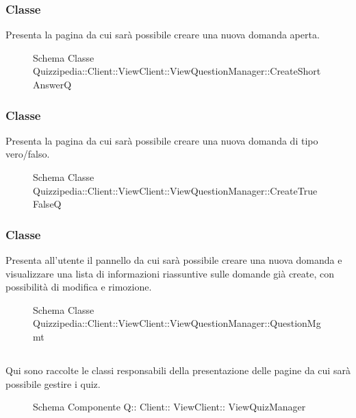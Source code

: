 \subsubsection{Classe }
Presenta la pagina da cui sarà possibile creare una nuova domanda aperta.
\begin{figure}[H]
\centering
\noindent{}
\caption[Schema Classe CreateShortAnswerQ]{Schema Classe Quizzipedia::Client::ViewClient::ViewQuestionManager::CreateShortAnswerQ}
\end{figure}
\subsubsection{Classe }
Presenta la pagina da cui sarà possibile creare una nuova domanda di tipo vero/falso.
\begin{figure}[H]
\centering
\noindent{}
\caption[Schema Classe CreateTrueFalseQ]{Schema Classe Quizzipedia::Client::ViewClient::ViewQuestionManager::CreateTrueFalseQ}
\end{figure}
\subsubsection{Classe }
Presenta all'utente il pannello da cui sarà possibile creare una nuova domanda e visualizzare una lista di informazioni riassuntive sulle domande già create, con possibilità di modifica e rimozione.
\begin{figure}[H]
\centering
\noindent{}
\caption[Schema Classe QuestionMgmt]{Schema Classe Quizzipedia::Client::ViewClient::ViewQuestionManager::QuestionMgmt}
\end{figure}
\subsection{}
Qui sono raccolte le classi responsabili della presentazione delle pagine da cui sarà possibile gestire i quiz.
\begin{figure}[H]
\centering
\noindent{}
\caption[Schema Componente Quizzipedia::Client::ViewClient::ViewQuizManager]{Schema Componente Q:: Client:: ViewClient:: ViewQuizManager}
\end{figure}
